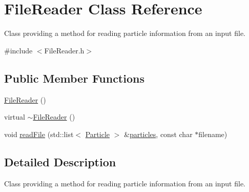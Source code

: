 \hypertarget{classFileReader}{\section{File\-Reader Class Reference}
\label{classFileReader}
}


Class providing a method for reading particle information from an input file.  




{\ttfamily \#include $<$File\-Reader.\-h$>$}

\subsection*{Public Member Functions}
\begin{DoxyCompactItemize}
\item 
\hyperlink{classFileReader_a615dcb2443cad1f2ca123c7c0c334480}{File\-Reader} ()
\item 
virtual \hyperlink{classFileReader_a1382969e8f1468f3b04ad4b44ab39dee}{$\sim$\-File\-Reader} ()
\item 
void \hyperlink{classFileReader_af17396d42767c1daec43d3598f53efac}{read\-File} (std\-::list$<$ \hyperlink{classParticle}{Particle} $>$ \&\hyperlink{MolSim_8cpp_a6b352757b6951d85f71bd9cbc47cf619}{particles}, const char $\ast$filename)
\end{DoxyCompactItemize}


\subsection{Detailed Description}
Class providing a method for reading particle information from an input file. 

